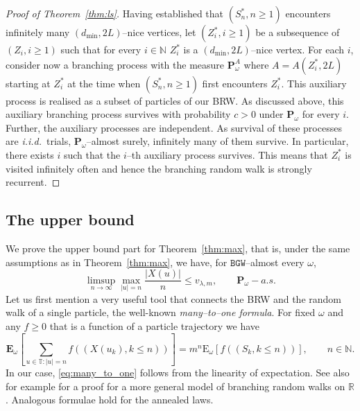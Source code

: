 \documentclass[11 pt]{article}
\theoremstyle{definition}
\numberwithin{equation}{section}
\newcommand{\NN}{\mathbb{N}}
\newcommand{\RR}{\mathbb{R}}
\newcommand{\Pw}{\mathbf{P}_{\omega}} %
\begin{document}
\begin{proof}[Proof of Theorem~\ref{thm:ls}]
Having established that $(S_n^*, n\geq 1)$ encounters infinitely many $(d_{\min},2L)$--nice vertices, let $(Z_i^*,i\geq 1)$ be a subsequence of $(Z_i,i\geq1)$ such that for every $i\in \NN$ $Z_i^*$ is a $(d_{\min},2L)$--nice vertex. For each $i$, consider now a branching process with the measure $\mathbf{P}^{A}_{\omega}$ where $A= A(Z_i^*,2L)$ starting at $Z_i^*$ at the time when $(S_n^*,n\geq 1)$ first encounters $Z_i^*$. This auxiliary process is realised as a subset of particles of our BRW. As discussed above, this auxiliary branching process survives with probability $c>0$ under $\Pw$ for every $i$. Further, the auxiliary processes are independent. As survival of these processes are \emph{i.i.d.}\ trials, $\Pw$--almost surely, infinitely many of them survive. In particular, there exists $i$ such that the $i$--th auxiliary process survives. This means that $Z_i^*$ is visited infinitely often and hence the branching random walk is strongly recurrent. 
\end{proof}


\subsection{The upper bound}\label{sec:upper}
We prove the upper bound part for Theorem~\ref{thm:max}, that is, under the same assumptions as in Theorem~\ref{thm:max}, we have, for $\mathtt{BGW}$--almost every $\omega$, 
\begin{equation}\label{eq:conclusion_upper_bound}
	\limsup_{n \to \infty} \max_{|u|=n} \frac{\vert X(u) \vert }{n} \leq  v_{\lambda,m}, \qquad \Pw-a.s.
\end{equation}
Let us first mention a very useful tool that connects the BRW and the random walk of a single particle, the well-known \emph{many--to--one formula}. For fixed $\omega$ and any $f\geq0$ that is a function of a particle trajectory we have
\begin{equation}\label{eq:many_to_one}
	\mathbf{E}_{\omega}\left[\sum_{u\in \mathbb{T}\colon\vert u \vert = n} f\left((X(u_k), k\leq n) \right)\right] = m^n \mathrm{E}_{\omega} \left[ f\left((S_k, k\leq n) \right) \right], \qquad n\in \NN.
\end{equation}
In our case, \eqref{eq:many_to_one} follows from the linearity of expectation.
See also for example \cite[Theorem 1.1]{shi_branching_2015} for a proof for a more general model of branching random walks on $\RR$.
Analogous formulae hold for the annealed laws.
\end{document}
